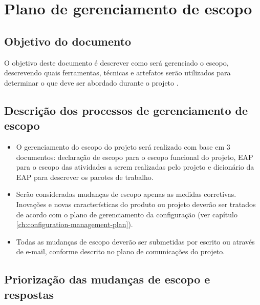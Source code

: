 

\chapter{Plano de gerenciamento de escopo}

\section{Objetivo do documento}

O objetivo deste documento é descrever como será gerenciado o escopo, descrevendo quais ferramentas, técnicas e artefatos serão utilizados para determinar o que deve ser abordado durante o projeto \projectName.

\section{Descrição dos processos de gerenciamento de escopo}

\begin{itemize}
	\item O gerenciamento do escopo do projeto será realizado com base em 3 documentos: declaração de escopo para o escopo funcional do projeto, EAP para o escopo das atividades a serem realizadas pelo projeto e dicionário da EAP para descrever os pacotes de trabalho.
	\item Serão consideradas mudanças de escopo apenas as medidas corretivas. Inovações e novas características do produto ou projeto deverão ser tratados de acordo com o plano de gerenciamento da configuração (ver capítulo \ref{ch:configuration-management-plan}).
	\item Todas as mudanças de escopo deverão ser submetidas por escrito ou através de e-mail, conforme descrito no plano de comunicações do projeto.
\end{itemize}

\section{Priorização das mudanças de escopo e respostas}

